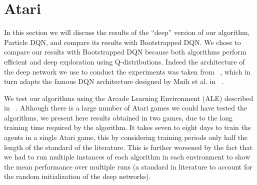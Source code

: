 \section{Atari}		 \label{sec:atari_experiments}
In this section we will discuss the results of the ``deep'' version of our algorithm, Particle DQN, and compare its results with Bootstrapped DQN. We chose to compare our results with Bootstrapped DQN because both algorithms perform efficient and deep exploration using Q-distributions. Indeed the architecture of the deep network we use to conduct the experiments was taken from ~\cite{DBLP:journals/corr/OsbandBPR16}, which in turn adapts the famous DQN architecture designed by Mnih et al. in ~\cite{mnih2015humanlevel}.\par
We test our algorithms using the Arcade Learning Environment (ALE) described in ~\cite{Bellemare:2013:ALE:2566972.2566979}. Although there is a large number of Atari games we could have tested the algorithms, we present here results obtained in two games, due to the long training time required by the algorithm. It takes seven to eight days to train the agents in a single Atari game, this by considering training periods only half the length of the standard of the literature. This is further worsened by the fact that we had to run multiple instances of each algorithm in each environment to show the mean performance over multiple runs (a standard in literature to account for the random initialization of the deep networks).
